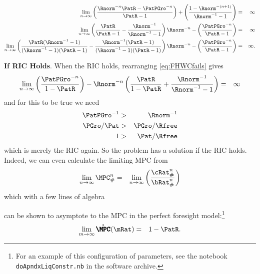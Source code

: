 \documentclass[../BufferStockTheory.tex]{subfiles}
\begin{document}
\begin{eqnarray}
  \lim_{n \rightarrow \infty} \left(\frac{\Rnorm^{-n}\PatR-\PatPGro^{-n}}{\PatR-1}\right) + \left(\frac{1-\Rnorm^{-(n+1)}}{\Rnorm^{-1}-1}\right) & = & \infty \notag
\\   \lim_{n \rightarrow \infty} \left(\frac{\PatR}{\PatR-1}-\frac{\Rnorm^{-1}}{\Rnorm^{-1}-1}\right)\Rnorm^{-n}-\left(\frac{\PatPGro^{-n}}{\PatR-1}\right) & = & \infty \notag
\\   \lim_{n \rightarrow \infty} \left(\frac{\PatR(\Rnorm^{-1}-1)}{(\Rnorm^{-1}-1)(\PatR-1)}-\frac{\Rnorm^{-1}(\PatR-1)}{(\Rnorm^{-1}-1)(\PatR-1)}\right)\Rnorm^{-n}-\left(\frac{\PatPGro^{-n}}{\PatR-1}\right) & = & \infty. \label{eq:FHWCfails}
\end{eqnarray}

{\bf If RIC Holds}.  When the RIC holds, rearranging \eqref{eq:FHWCfails} gives
\begin{eqnarray*}
  \lim_{n \rightarrow \infty} \left(\frac{\PatPGro^{-n}}{1-\PatR}\right)-\Rnorm^{-n}\left(\frac{\PatR}{1-\PatR}+\frac{\Rnorm^{-1}}{\Rnorm^{-1}-1}\right) & = & \infty
\end{eqnarray*}
and for this to be true we need
\begin{eqnarray*}
  \PatPGro^{-1} & > & \Rnorm^{-1}
\\ \PGro/\Pat & > & \PGro/\Rfree
\\ 1 & > & \Pat/\Rfree
\end{eqnarray*}
which is merely the RIC again.  So the problem has a solution if the RIC holds.  Indeed,
we can even calculate the limiting MPC from
\begin{eqnarray}
  \lim_{n \rightarrow \infty} \MPC^{n}_{\#} & = & \lim_{n \rightarrow \infty} \left(\frac{\cRat_{\#}^{n}}{\bRat_{\#}^{n}}\right)
\end{eqnarray}
which with a few lines of algebra
\begin{comment}
Calculate the limit of
\begin{eqnarray}
\left(\frac{\PatPGro^{-n}}{\PatPGro^{-n}/(1-\PatR) - (1-\Rnorm^{-1}\Rnorm^{-n})/(1-\Rnorm^{-1})}\right) & = & \left(\frac{1}{1/(1-\PatR) + \Rnorm^{-n}\Rnorm^{-1}/(1-\Rnorm^{-1})}\right)
\end{eqnarray}
\end{comment}
can be shown to asymptote to the MPC in the perfect foresight model:\footnote{For an example of this configuration of parameters, see the notebook \texttt{doApndxLiqConstr.nb} in the software archive.}
\begin{eqnarray}
  \lim_{m \rightarrow \infty} \mathring{\pmb{\MPC}}(\mRat) & = & 1-\PatR.
\end{eqnarray}
\end{document}
